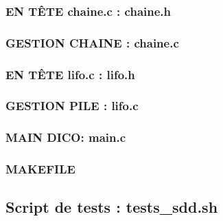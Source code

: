 \documentclass{report}
\begin{document}
\subsubsection{EN TÊTE chaine.c : chaine.h}
\begin{small}

\end{small}

\subsubsection{GESTION CHAINE : chaine.c}
\begin{small}

\end{small}

\subsubsection{EN TÊTE lifo.c : lifo.h}
\begin{small}

\end{small}

\subsubsection{GESTION PILE : lifo.c}
\begin{small}

\end{small}

\subsubsection{MAIN DICO: main.c}
\begin{small}

\end{small}

\subsubsection{MAKEFILE}
\begin{small}

\end{small}

\subsection{Script de tests : tests\_sdd.sh}
\begin{small}

\end{small}
\end{document}
